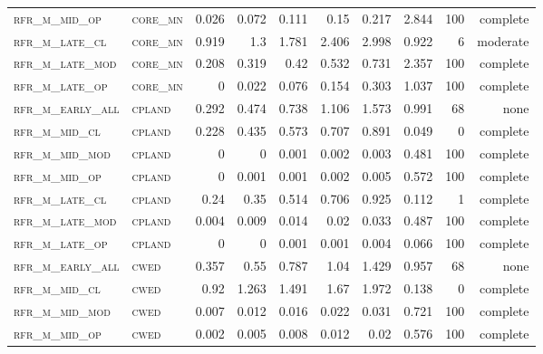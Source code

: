 \begin{landscape}
\begin{center}
\begin{footnotesize}
\begin{longtable}{llrrrrr|rrr}
\textsc{rfr\_m\_mid\_op   } & \textsc{core\_mn  }   & 0.026   & 0.072   & 0.111   & 0.15     & 0.217    & 2.844   & 100 & complete \\
\textsc{rfr\_m\_late\_cl  } & \textsc{core\_mn  }   & 0.919   & 1.3     & 1.781   & 2.406    & 2.998    & 0.922   & 6   & moderate \\
\textsc{rfr\_m\_late\_mod } & \textsc{core\_mn  }   & 0.208   & 0.319   & 0.42    & 0.532    & 0.731    & 2.357   & 100 & complete \\
\textsc{rfr\_m\_late\_op  } & \textsc{core\_mn  }   & 0       & 0.022   & 0.076   & 0.154    & 0.303    & 1.037   & 100 & complete \\
\textsc{rfr\_m\_early\_all} & \textsc{cpland    }   & 0.292   & 0.474   & 0.738   & 1.106    & 1.573    & 0.991   & 68  & none     \\
\textsc{rfr\_m\_mid\_cl   } & \textsc{cpland    }   & 0.228   & 0.435   & 0.573   & 0.707    & 0.891    & 0.049   & 0   & complete \\
\textsc{rfr\_m\_mid\_mod  } & \textsc{cpland    }   & 0       & 0       & 0.001   & 0.002    & 0.003    & 0.481   & 100 & complete \\
\textsc{rfr\_m\_mid\_op   } & \textsc{cpland    }   & 0       & 0.001   & 0.001   & 0.002    & 0.005    & 0.572   & 100 & complete \\
\textsc{rfr\_m\_late\_cl  } & \textsc{cpland    }   & 0.24    & 0.35    & 0.514   & 0.706    & 0.925    & 0.112   & 1   & complete \\
\textsc{rfr\_m\_late\_mod } & \textsc{cpland    }   & 0.004   & 0.009   & 0.014   & 0.02     & 0.033    & 0.487   & 100 & complete \\
\textsc{rfr\_m\_late\_op  } & \textsc{cpland    }   & 0       & 0       & 0.001   & 0.001    & 0.004    & 0.066   & 100 & complete \\
\textsc{rfr\_m\_early\_all} & \textsc{cwed      }   & 0.357   & 0.55    & 0.787   & 1.04     & 1.429    & 0.957   & 68  & none     \\
\textsc{rfr\_m\_mid\_cl   } & \textsc{cwed      }   & 0.92    & 1.263   & 1.491   & 1.67     & 1.972    & 0.138   & 0   & complete \\
\textsc{rfr\_m\_mid\_mod  } & \textsc{cwed      }   & 0.007   & 0.012   & 0.016   & 0.022    & 0.031    & 0.721   & 100 & complete \\
\textsc{rfr\_m\_mid\_op   } & \textsc{cwed      }   & 0.002   & 0.005   & 0.008   & 0.012    & 0.02     & 0.576   & 100 & complete \\

\end{longtable}
\end{footnotesize}
\end{center}
\end{landscape}
